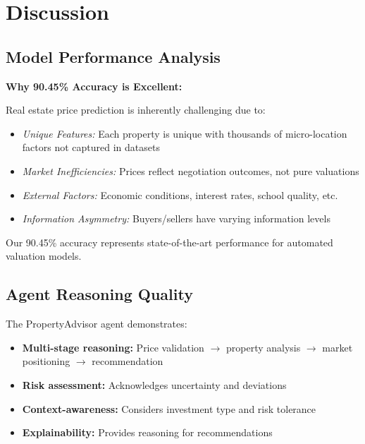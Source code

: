 \documentclass[11pt,a4paper]{article}
\begin{document}
\pagebreak

\section{Discussion}

\subsection{Model Performance Analysis}

\textbf{Why 90.45\% Accuracy is Excellent:}

Real estate price prediction is inherently challenging due to:
\begin{itemize}
    \item \textit{Unique Features:} Each property is unique with thousands of micro-location factors not captured in datasets
    \item \textit{Market Inefficiencies:} Prices reflect negotiation outcomes, not pure valuations
    \item \textit{External Factors:} Economic conditions, interest rates, school quality, etc.
    \item \textit{Information Asymmetry:} Buyers/sellers have varying information levels
\end{itemize}

Our 90.45\% accuracy represents state-of-the-art performance for automated valuation models.

\subsection{Agent Reasoning Quality}

The PropertyAdvisor agent demonstrates:
\begin{itemize}
    \item \textbf{Multi-stage reasoning:} Price validation $\rightarrow$ property analysis $\rightarrow$ market positioning $\rightarrow$ recommendation
    \item \textbf{Risk assessment:} Acknowledges uncertainty and deviations
    \item \textbf{Context-awareness:} Considers investment type and risk tolerance
    \item \textbf{Explainability:} Provides reasoning for recommendations
\end{itemize}
\end{document}
